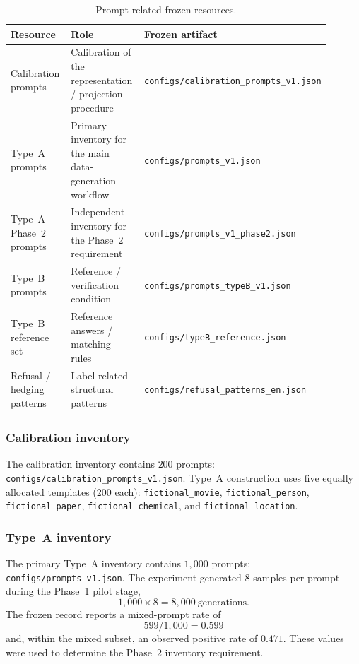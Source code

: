 \documentclass{article}
\begin{document}
\begin{table}[t]
\centering
\caption{Prompt-related frozen resources.}
\label{tab:prompt-res}
\small
\setlength{\tabcolsep}{3.5pt}
\begin{tabular}{@{}p{0.24\linewidth}p{0.30\linewidth}p{0.36\linewidth}@{}}
\toprule
Resource & Role & Frozen artifact \\
\midrule
Calibration prompts & Calibration of the representation / projection procedure & \texttt{configs/calibration\_prompts\_v1.json} \\
Type~A prompts & Primary inventory for the main data-generation workflow & \texttt{configs/prompts\_v1.json} \\
Type~A Phase~2 prompts & Independent inventory for the Phase~2 requirement & \texttt{configs/prompts\_v1\_phase2.json} \\
Type~B prompts & Reference / verification condition & \texttt{configs/prompts\_typeB\_v1.json} \\
Type~B reference set & Reference answers / matching rules & \texttt{configs/typeB\_reference.json} \\
Refusal / hedging patterns & Label-related structural patterns & \texttt{configs/refusal\_patterns\_en.json} \\
\bottomrule
\end{tabular}
\end{table}

\subsubsection{Calibration inventory}
The calibration inventory contains $200$ prompts:
\texttt{configs/calibration\_prompts\_v1.json}.
Type~A construction uses five equally allocated templates ($200$ each):
\texttt{fictional\_movie}, \texttt{fictional\_person}, \texttt{fictional\_paper}, \texttt{fictional\_chemical}, and \texttt{fictional\_location}.

\subsubsection{Type~A inventory}
The primary Type~A inventory contains $1{,}000$ prompts:
\texttt{configs/prompts\_v1.json}.
The experiment generated $8$ samples per prompt during the Phase~1 pilot stage,
\begin{equation}
  1{,}000\times 8=8{,}000\ \text{generations}.
\end{equation}
The frozen record reports a mixed-prompt rate of
\begin{equation}
  599/1{,}000=0.599
\end{equation}
and, within the mixed subset, an observed positive rate of $0.471$.
These values were used to determine the Phase~2 inventory requirement.
\end{document}
